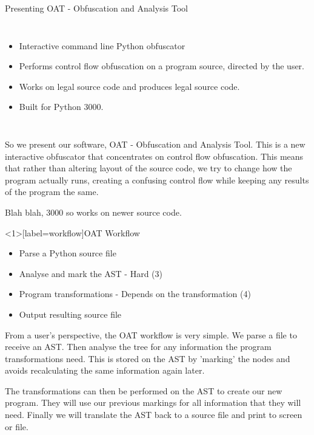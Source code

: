 \begin{frame}{Presenting OAT - Obfuscation and Analysis Tool}
\begin{columns}
\begin{itemize}
\item Interactive command line Python obfuscator
\item Performs control flow obfuscation on a program source, directed by the user.
\item Works on legal source code and produces legal source code.
\item Built for Python 3000.
\end{itemize}
\end{columns}
\end{frame}

So we present our software, OAT - Obfuscation and Analysis Tool. This is a new interactive obfuscator that concentrates on control flow obfuscation.
This means that rather than altering layout of the source code, we try to change how the program actually runs, creating a confusing control flow while
keeping any results of the program the same.

Blah blah, 3000 so works on newer source code.

\begin{frame}<1>[label=workflow]{OAT Workflow}
\begin{itemize}
\item Parse a Python source file 
\item Analyse and mark the AST - Hard (3)
\item Program transformations - Depends on the transformation (4)
\item Output resulting source file 
\end{itemize}
\end{frame}

From a user's perspective, the OAT workflow is very simple. We parse a file to receive an AST. Then analyse the tree for any information the program
transformations need. This is stored on the AST by 'marking' the nodes and avoids recalculating the same information again later.

The transformations can then be performed on the AST to create our new program. They will use our previous markings for all information that they will need.
Finally we will translate the AST back to a source file and print to screen or file.

